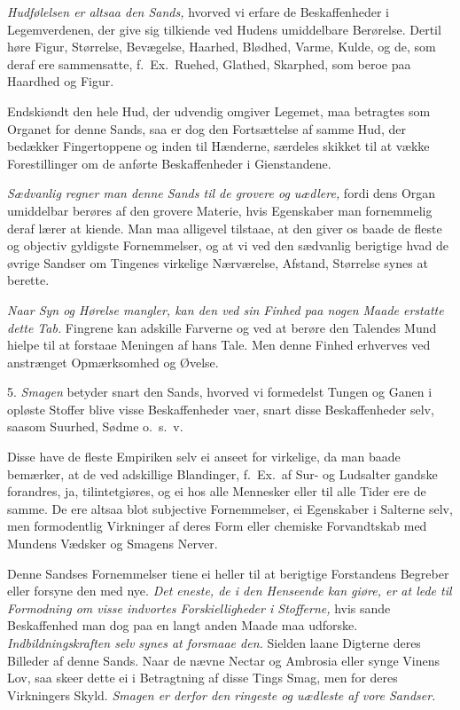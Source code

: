 \documentclass[12pt,a4paper]{article}
\newcommand{\opage}[1]{\marginnote{\footnotesize\textit{[#1]}}}
\begin{document}
\emph{Hudfølelsen er altsaa den Sands,} hvorved vi erfare de Beskaffenheder i
Legemverdenen, der give sig tilkiende ved Hudens umiddelbare Berørelse. Dertil høre
Figur, Størrelse, Bevægelse, Haarhed, Blødhed, Varme, Kulde, og de, som deraf ere
sammensatte, f.~Ex.\ Ruehed, Glathed, Skarphed, som beroe paa Haardhed og Figur.

Endskiøndt den hele Hud, der udvendig omgiver Legemet, maa betragtes som Organet for
denne Sands,
\opage{64} saa er dog den Fortsættelse af samme Hud, der bedækker Fingertoppene og inden til
Hænderne, særdeles skikket til at vække Forestillinger om de anførte Beskaffenheder i
Gienstandene.

\emph{Sædvanlig regner man denne Sands til de grovere og uædlere,} fordi dens Organ
umiddelbar berøres af den grovere Materie, hvis Egenskaber man fornemmelig deraf lærer
at kiende. Man maa alligevel tilstaae, at den giver os baade de fleste og objectiv
gyldigste Fornemmelser, og at vi ved den sædvanlig berigtige hvad de øvrige Sandser om
Tingenes virkelige Nærværelse, Afstand, Størrelse synes at berette.

\emph{Naar Syn og Hørelse mangler, kan den ved sin Finhed paa nogen Maade erstatte
dette Tab.} Fingrene kan adskille Farverne og ved at berøre den Talendes Mund hielpe
til at forstaae Meningen af hans Tale. Men denne Finhed erhverves ved anstrænget
Opmærksomhed og Øvelse.

5. \emph{Smagen} betyder snart den Sands, hvorved vi formedelst Tungen og Ganen i
opløste Stoffer blive visse Beskaffenheder vaer, snart disse Beskaffenheder selv,
saasom Suurhed, Sødme o.~s.~v.

Disse have de fleste Empiriken selv ei anseet for
virkelige, da man baade bemærker, at de ved adskillige Blandinger, f.~Ex.\ af Sur- og
Ludsalter gandske forandres, ja, tilintetgiøres, og ei hos alle Mennesker eller
\opage{65} til alle Tider ere de samme. De ere altsaa blot subjective Fornemmelser, ei Egenskaber
i Salterne selv, men formodentlig Virkninger af deres Form eller chemiske
Forvandtskab med Mundens Vædsker og Smagens Nerver.

Denne Sandses Fornemmelser tiene ei heller til at berigtige Forstandens Begreber eller
forsyne den med nye. \emph{Det eneste, de i den Henseende kan giøre, er at lede til
Formodning om visse indvortes Forskielligheder i Stofferne,} hvis sande Beskaffenhed
man dog paa en langt anden Maade maa udforske. \emph{Indbildningskraften selv synes at
forsmaae den.} Sielden laane Digterne deres Billeder af denne Sands. Naar de nævne
Nectar og Ambrosia eller synge Vinens Lov, saa skeer dette ei i Betragtning af disse
Tings Smag, men for deres Virkningers Skyld. \emph{Smagen er derfor den ringeste og
uædleste af vore Sandser.}
\end{document}
